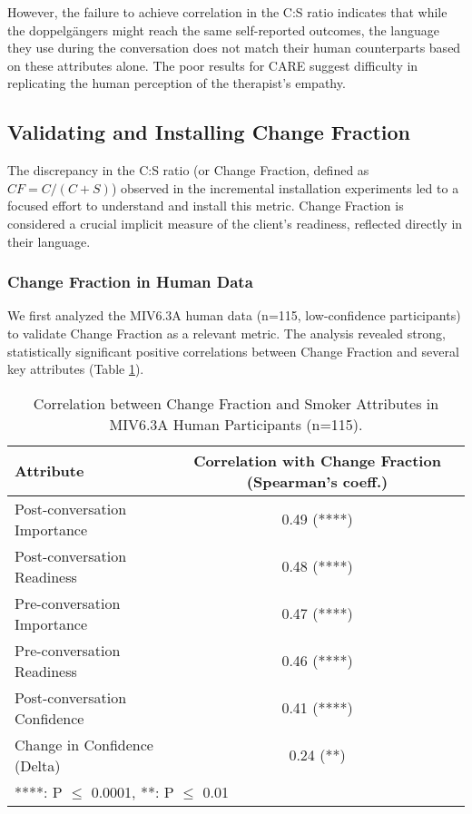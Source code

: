 However, the failure to achieve correlation in the C:S ratio indicates that while the doppelgängers might reach the same self-reported outcomes, the language they use during the conversation does not match their human counterparts based on these attributes alone. The poor results for CARE suggest difficulty in replicating the human perception of the therapist's empathy.

\subsection{Validating and Installing Change Fraction}

The discrepancy in the C:S ratio (or Change Fraction, defined as $CF = C / (C + S)$) observed in the incremental installation experiments led to a focused effort to understand and install this metric. Change Fraction is considered a crucial implicit measure of the client's readiness, reflected directly in their language.

\subsubsection{Change Fraction in Human Data}

We first analyzed the MIV6.3A human data (n=115, low-confidence participants) to validate Change Fraction as a relevant metric. The analysis revealed strong, statistically significant positive correlations between Change Fraction and several key attributes (Table \ref{tab:cf_human_correlation}).

\begin{table}[h]
\centering
\caption{Correlation between Change Fraction and Smoker Attributes in MIV6.3A Human Participants (n=115).}
\label{tab:cf_human_correlation}
\begin{tabular}{|l|c|}
\hline
\textbf{Attribute} & \textbf{Correlation with Change Fraction (Spearman's coeff.)} \\ \hline
Post-conversation Importance & 0.49 (****) \\
Post-conversation Readiness & 0.48 (****) \\
Pre-conversation Importance & 0.47 (****) \\
Pre-conversation Readiness & 0.46 (****) \\
Post-conversation Confidence & 0.41 (****) \\
Change in Confidence (Delta) & 0.24 (**) \\ \hline
\multicolumn{2}{l}{\footnotesize{****: P $\leq$ 0.0001, **: P $\leq$ 0.01}}
\end{tabular}
\end{table}

